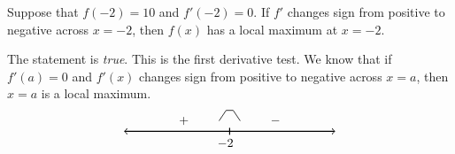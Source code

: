 \documentclass[11pt,letterpaper]{article}
\begin{document}
\newpage



 Suppose that $f(-2)= 10$ and $f'(-2)= 0$. If $f'$ changes sign from positive to negative across $x= -2$, then $f(x)$ has a local maximum at $x= -2$. \pspace

\sol The statement is \textit{true}. This is the first derivative test. We know that if $f'(a)= 0$ and $f'(x)$ changes sign from positive to negative across $x= a$, then $x= a$ is a local maximum. 
	\[
	\begin{tikzpicture}
	\draw[line width=0.03cm,<->] (-3,0) -- (3,0);
	\draw[line width=0.03cm] (0,-0.1) -- (0,0.1);
	\node at (-0.12,-0.35) {$-2$};
	\node at (-1.3,0.3) {$+$};
	\node at (1.3,0.3) {$-$};
	\draw[line width=0.02cm] (-0.3,0.3) -- (-0.1,0.6) -- (0.1,0.6) -- (0.3,0.3);
	\end{tikzpicture}
	\]
\end{document}
